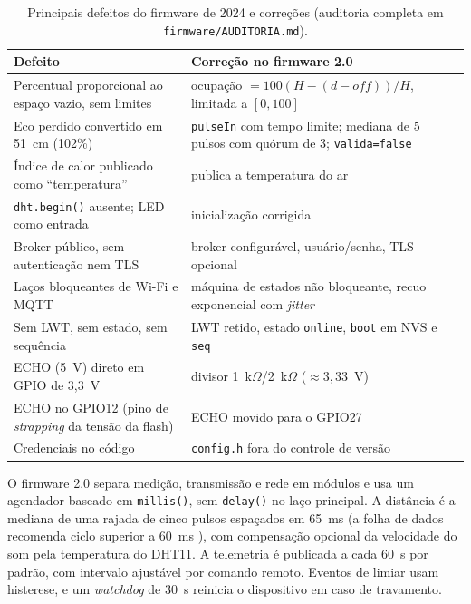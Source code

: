 \begin{table}[ht]
\centering
\caption{Principais defeitos do firmware de 2024 e correções (auditoria completa em \texttt{firmware/AUDITORIA.md}).}
\label{tab:auditoria}
\footnotesize
\begin{tabularx}{\textwidth}{@{}>{\raggedright\arraybackslash}p{4.6cm}>{\raggedright\arraybackslash}X@{}}
\toprule
Defeito & Correção no firmware 2.0 \\
\midrule
Percentual proporcional ao espaço vazio, sem limites & ocupação $=100(H-(d-\mathit{off}))/H$, limitada a $[0,100]$ \\
Eco perdido convertido em 51~cm (102\%) & \texttt{pulseIn} com tempo limite; mediana de 5 pulsos com quórum de 3; \texttt{valida=false} \\
Índice de calor publicado como ``temperatura'' & publica a temperatura do ar \\
\texttt{dht.begin()} ausente; LED como entrada & inicialização corrigida \\
Broker público, sem autenticação nem TLS & broker configurável, usuário/senha, TLS opcional \\
Laços bloqueantes de Wi-Fi e MQTT & máquina de estados não bloqueante, recuo exponencial com \emph{jitter} \\
Sem LWT, sem estado, sem sequência & LWT retido, estado \texttt{online}, \texttt{boot} em NVS e \texttt{seq} \\
ECHO (5~V) direto em GPIO de 3,3~V & divisor 1~k$\Omega$/2~k$\Omega$ ($\approx 3{,}33$~V) \\
ECHO no GPIO12 (pino de \emph{strapping} da tensão da flash) & ECHO movido para o GPIO27 \\
Credenciais no código & \texttt{config.h} fora do controle de versão \\
\bottomrule
\end{tabularx}
\end{table}

O firmware 2.0 separa medição, transmissão e rede em módulos e usa um
agendador baseado em \texttt{millis()}, sem \texttt{delay()} no laço principal.
A distância é a mediana de uma rajada de cinco pulsos espaçados em 65~ms (a
folha de dados recomenda ciclo superior a 60~ms \cite{elecfreakssdhcsr04}),
com compensação opcional da velocidade do som pela temperatura do DHT11. A
telemetria é publicada a cada 60~s por padrão, com intervalo ajustável por
comando remoto. Eventos de limiar usam histerese, e um \emph{watchdog} de 30~s
reinicia o dispositivo em caso de travamento.

